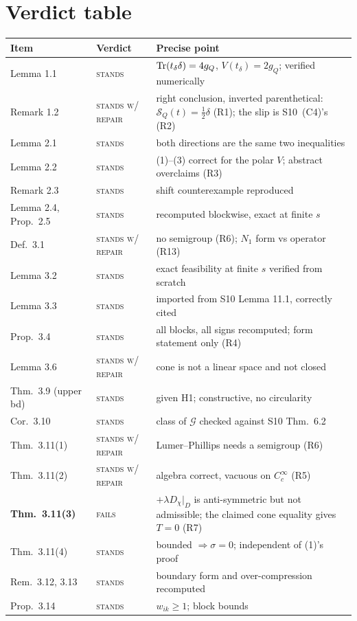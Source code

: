 \documentclass[11pt]{article}
\newcommand{\SLD}{\mathcal S_Q}
\begin{document}
\section{Verdict table}\label{sec:table}
\newcommand{\vS}{\textsc{stands}}
\newcommand{\vR}{\textsc{stands w/ repair}}
\newcommand{\vF}{\textsc{fails}}
{\small\begin{tabular}{@{}llp{7.6cm}@{}}
\hline
Item & Verdict & Precise point\\ \hline
Lemma 1.1 & \vS & $\operatorname{Tr}(t_\delta\delta)=4g_Q$, $V(t_\delta)=2g_Q$; verified numerically\\
Remark 1.2 & \vR & right conclusion, inverted parenthetical: $\SLD(t)=\frac12\delta$ (R1); the slip is S10~(C4)'s (R2)\\
Lemma 2.1 & \vS & both directions are the same two inequalities\\
Lemma 2.2 & \vS & (1)--(3) correct for the polar $V$; abstract overclaims (R3)\\
Remark 2.3 & \vS & shift counterexample reproduced\\
Lemma 2.4, Prop.~2.5 & \vS & recomputed blockwise, exact at finite $s$\\
Def.~3.1 & \vR & no semigroup (R6); $N_1$ form vs operator (R13)\\
Lemma 3.2 & \vS & exact feasibility at finite $s$ verified from scratch\\
Lemma 3.3 & \vS & imported from S10 Lemma 11.1, correctly cited\\
Prop.~3.4 & \vS & all blocks, all signs recomputed; form statement only (R4)\\
Lemma 3.6 & \vR & cone is not a linear space and not closed\\
Thm.~3.9 (upper bd) & \vS & given H1; constructive, no circularity\\
Cor.~3.10 & \vS & class of $\mathcal G$ checked against S10 Thm.~6.2\\
Thm.~3.11(1) & \vR & Lumer--Phillips needs a semigroup (R6)\\
Thm.~3.11(2) & \vR & algebra correct, vacuous on $C_c^\infty$ (R5)\\
\textbf{Thm.~3.11(3)} & \vF & $+\lambda D_\chi|_D$ is anti-symmetric but not admissible; the claimed cone equality gives $T=0$ (R7)\\
Thm.~3.11(4) & \vS & bounded $\Rightarrow\sigma=0$; independent of (1)'s proof\\
Rem.~3.12, 3.13 & \vS & boundary form and over-compression recomputed\\
Prop.~3.14 & \vS & $w_{ik}\ge1$; block bounds\\

\end{tabular}}
\end{document}
